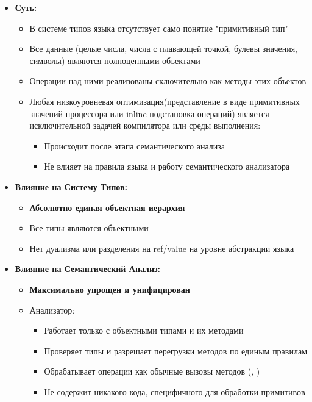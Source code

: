 \begin{itemize}[leftmargin=*, label={--}]
    \item \textbf{Суть:}
    \begin{itemize}
        \item В системе типов языка отсутствует само понятие "примитивный тип"
        \item Все данные (целые числа, числа с плавающей точкой, булевы значения, символы) являются полноценными объектами
        \item Операции над ними реализованы сключительно как методы этих объектов
        \item Любая низкоуровневая оптимизация(представление в виде примитивных значений процессора или inline-подстановка операций)
        является исключительной задачей компилятора или среды выполнения:
        \begin{itemize}
            \item Происходит после этапа семантического анализа
            \item Не влияет на правила языка и работу семантического анализатора
        \end{itemize}
    \end{itemize}

    \item \textbf{Влияние на Систему Типов:}
    \begin{itemize}
        \item \textbf{Абсолютно единая объектная иерархия}
        \item Все типы являются объектными
        \item Нет дуализма или разделения на ref/value на уровне абстракции языка
    \end{itemize}

    \item \textbf{Влияние на Семантический Анализ:}
    \begin{itemize}
        \item \textbf{Максимально упрощен и унифицирован}
        \item Анализатор:
        \begin{itemize}
            \item Работает только с объектными типами и их методами
            \item Проверяет типы и разрешает перегрузки методов по единым правилам
            \item Обрабатывает операции как обычные вызовы методов (, )
            \item Не содержит никакого кода, специфичного для обработки примитивов
        \end{itemize}
    \end{itemize}


\end{itemize}
